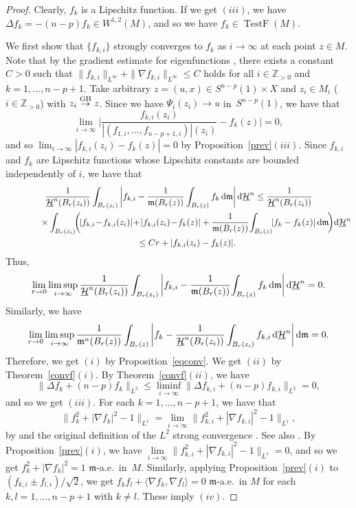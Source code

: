 \documentclass[10pt,a4paper]{amsart}
\numberwithin{equation}{section}
\theoremstyle{definition}
\newcommand{\TestF}{\operatorname{TestF}}
\newcommand{\Z}{\mathbb{Z}}
\newcommand{\mf}{\mathfrak{m}}
\newcommand{\nHa}{\underline{\mathcal{H}}}
\begin{document}
\begin{proof}
Clearly, $f_k$ is a Lipschitz function.
If we get $(iii)$, we have $\Delta f_k=-(n-p)f_k\in W^{1,2}(M)$, and so we have $f_k\in \TestF(M)$.

We first show that $\{f_{k,i}\}$ strongly converges to $f_k$ as $i\to \infty$ at each point $z\in M$.
Note that by the gradient estimate for eigenfunctions \cite[Theorem~7.3]{Pe3}, there exists a constant $C>0$ such that
$\|f_{k,i}\|_{L^\infty}+\|\nabla f_{k,i}\|_{L^\infty}\leq C$ holds for all $i\in \Z_{>0}$ and $k=1,\ldots, n-p+1$.
Take arbitrary $z=(u,x)\in S^{n-p}(1)\times X$ and $z_i\in M_i$ ($i\in \Z_{>0}$) with $z_i \stackrel{{\rm GH}}{\to} z$.
Since we have $\Psi_i(z_i)\to u$ in~$S^{n-p}(1)$, we have that
\[
\lim_{i\to \infty}\bigg|
\frac{f_{k,i}(z_i)}{|(f_{1,i},\ldots, f_{n-p+1,i})|(z_i)}-f_k(z)
\bigg|=0,
\]
and so $\lim_{i\to \infty}|f_{k,i}(z_i)-f_k(z)|=0$ by Proposition~\ref{prev}$(iii)$.
Since $f_{k,i}$ and $f_k$ are Lipschitz functions whose Lipschitz constants are bounded independently of $i$, we have that
\begin{gather*}
\frac{1}{\nHa^n(B_r (z_i))}\int_{B_r(z_i)}\bigg|f_{k,i}-\frac{1}{\mf(B_r(z))}\int_{B_r(z)}f_k\,{\rm d}\mf\bigg|\,{\rm d}\nHa^n\leq\frac{1}{\nHa^n(B_r (z_i))}
\\ \qquad\qquad
\times\int_{B_r(z_i)}\!\!\bigg(\!|f_{k,i}\!-\!f_{k,i}(z_i)|\!+\!|f_{k,i}(z_i)\!-\!f_k(z)|
+\frac{1}{\mf(B_r(z))}\!\int_{B_r(z)}\!\!|f_k-f_k(z)|\,{\rm d}\mf\!\bigg){\rm d}\nHa^n
\\ \qquad
\leq C r + |f_{k,i}(z_i)-f_k(z)|.
\end{gather*}
Thus,
\begin{gather*}
\lim_{r\to 0}\limsup_{i\to \infty}\frac{1}{\nHa^n(B_r (z_i))}\int_{B_r(z_i)}\bigg|f_{k,i}-\frac{1}{\mf(B_r(z))}\!\int_{B_r(z)}f_k\,{\rm d}\mf\bigg|\,{\rm d}\nHa^n=0.
\end{gather*}
Similarly, we have
\[
\lim_{r\to 0}\limsup_{i\to \infty}\frac{1}{\mf^n(B_r (z))}\int_{B_r(z)}\bigg|f_{k}-\frac{1}{\nHa^n(B_r(z_i))}\int_{B_r(z_i)}f_{k,i}\,{\rm d}\nHa^n\bigg|\,{\rm d}\mf=0.
\]
Therefore, we get $(i)$ by Proposition~\ref{eqconv}.
We get $(ii)$ by Theorem~\ref{convf}$(i)$.
By Theorem~\ref{convf}$(ii)$, we have
\[
\|\Delta f_k+(n-p)f_k\|_{L^2}\leq\liminf_{i\to \infty}\|\Delta f_{k,i}+(n-p)f_{k,i}\|_{L^2}=0,
\]
and so we get $(iii)$.
For each $k=1,\ldots,n-p+1$, we have that
\[
\|f_k^2 +|\nabla f_k|^2-1\|_{L^1}=\lim_{i\to \infty} \|f_{k,i}^2 +|\nabla f_{k,i}|^2-1\|_{L^1},
\]
by \cite[Propositions~3.11 and~3.45]{Ho1} and the original definition of the $L^2$ strong convergence \cite[Definitions~3.25 and~3.58]{Ho1}.
See also \cite[Proposition~3.3 and~Theorem~5.7]{AH}.
By Proposition~\ref{prev}$(i)$, we have $\lim\limits_{i\to \infty} \|f_{k,i}^2 +|\nabla f_{k,i}|^2-1\|_{L^1}=0$, and so we get $f_k^2+|\nabla f_k|^2=1$ $\mf$-a.e.\ in~$M$.
Similarly, applying Proposition~\ref{prev}$(i)$ to $(f_{k,i}\pm f_{l,i})/{\sqrt{2}}$, we get $f_k f_l +\langle\nabla f_k,\nabla f_l\rangle=0$ $\mf$-a.e.\ in $M$ for each $k,l=1,\ldots,n-p+1$ with $k\neq l$.
These imply $(iv)$.
\end{proof}
\end{document}
